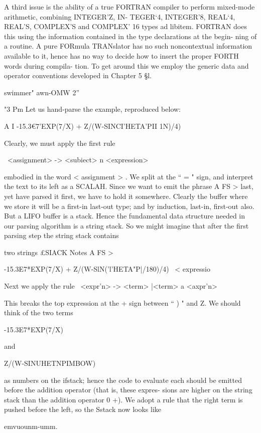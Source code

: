 A third issue is the ability of a true FORTRAN compiler to
perform mixed-mode arithmetic, combining INTEGER'Z, IN-
TEGER‘4, INTEGER'8, REAL‘4, REAL'S, COMPLEX'S
and COMPLEX' 16 types ad libitem. FORTRAN does this using
the information contained in the type declarations at the begin-
ning of a routine. A pure FORmula TRANslator has no such
noncontextual information available to it, hence has no way to
decide how to insert the proper FORTH words during compila-
tion. To get around this we employ the generic data and operator
conventions developed in Chapter 5 §l.

swimmer" awn-OMW 2”

"3 Pm
Let us hand-parse the example, reproduced below:

A I -15.3€7'EXP(7/X) + Z/(W-SINCI'HETA'PII 1N)/4)

Clearly, we must apply the first rule

\ <assignment> -> <subiect> n <expression>

embodied in the word < assignment > . We split at the “ = " sign,
and interpret the text to its left as a SCALAH. Since we want to
emit the phrase A FS > last, yet have parsed it first, we have to
hold it somewhere. Clearly the buffer where we store it will be a
first-in last-out type; and by induction, last-in, first-out also. But
a LIFO buffer is a stack. Hence the fundamental data structure
needed in our parsing algorithm is a string stack. So we might
imagine that after the first parsing step the string stack contains

 

two strings
£SIACK Notes
A FS > \ < subject >

-15.3E7*EXP(7/X) + Z/(W-SlN('l’HETA"P|/180)/4) \ < expressio

Next we apply the rule
\ <expr'n> -> <term> |<term> a <axpr'n>

This breaks the top expression at the + sign between “ ) " and Z.
We should think of the two terms

-15.3E7*EXP(7/X)

and

Z/(W-SINUHETNPIMBOW)

as numbers on the ifstack; hence the code to evaluate each should
be emitted before the addition operator (that is, these expres-
sions are higher on the string stack than the addition operator
0 +). We adopt a rule that the right term is pushed before the
left, so the Sstack now looks like

emvuounm-umm.

